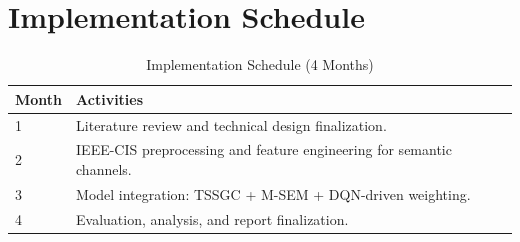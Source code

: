 \documentclass[12pt,a4paper]{report}
\begin{document}
\section{Implementation Schedule}
\begin{table}[h!]
\centering
\caption{Implementation Schedule (4 Months)}
\begin{tabular}{@{}p{2cm}p{11cm}@{}}
\toprule
\textbf{Month} & \textbf{Activities} \\
\midrule
1 & Literature review and technical design finalization. \\
2 & IEEE-CIS preprocessing and feature engineering for semantic channels. \\
3 & Model integration: TSSGC + M-SEM + DQN-driven weighting. \\
4 & Evaluation, analysis, and report finalization. \\
\bottomrule
\end{tabular}
\end{table}
\end{document}
